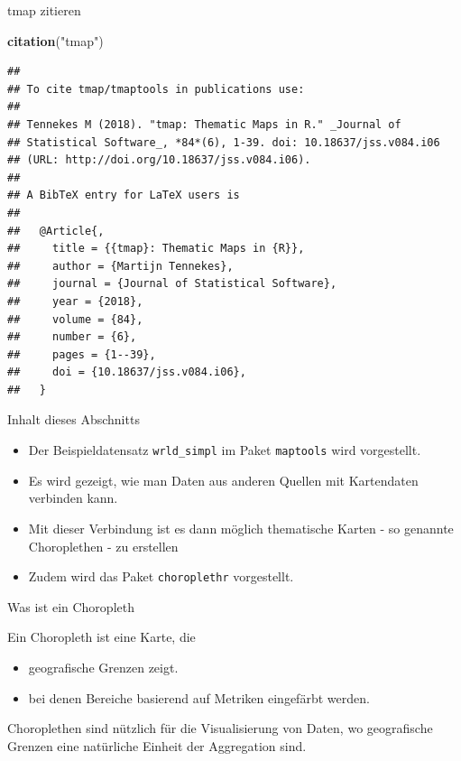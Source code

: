 \documentclass[ignorenonframetext,]{beamer}
\newenvironment{Shaded}{\begin{snugshade}}{\end{snugshade}}
\newcommand{\KeywordTok}[1]{\textcolor[rgb]{0.13,0.29,0.53}{\textbf{#1}}}
\newcommand{\StringTok}[1]{\textcolor[rgb]{0.31,0.60,0.02}{#1}}
\newcommand{\NormalTok}[1]{#1}
\providecommand{\tightlist}{%
  \setlength{\itemsep}{0pt}\setlength{\parskip}{0pt}}
\begin{document}
\begin{frame}[fragile]{tmap zitieren}

\begin{Shaded}
\begin{Highlighting}[]
\KeywordTok{citation}\NormalTok{(}\StringTok{"tmap"}\NormalTok{)}
\end{Highlighting}
\end{Shaded}

\begin{verbatim}
## 
## To cite tmap/tmaptools in publications use:
## 
## Tennekes M (2018). "tmap: Thematic Maps in R." _Journal of
## Statistical Software_, *84*(6), 1-39. doi: 10.18637/jss.v084.i06
## (URL: http://doi.org/10.18637/jss.v084.i06).
## 
## A BibTeX entry for LaTeX users is
## 
##   @Article{,
##     title = {{tmap}: Thematic Maps in {R}},
##     author = {Martijn Tennekes},
##     journal = {Journal of Statistical Software},
##     year = {2018},
##     volume = {84},
##     number = {6},
##     pages = {1--39},
##     doi = {10.18637/jss.v084.i06},
##   }
\end{verbatim}

\end{frame}

\begin{frame}[fragile]{Inhalt dieses Abschnitts}

\begin{itemize}
\tightlist
\item
  Der Beispieldatensatz \texttt{wrld\_simpl} im Paket \texttt{maptools}
  wird vorgestellt.
\item
  Es wird gezeigt, wie man Daten aus anderen Quellen mit Kartendaten
  verbinden kann.
\item
  Mit dieser Verbindung ist es dann möglich thematische Karten - so
  genannte Choroplethen - zu erstellen
\item
  Zudem wird das Paket \texttt{choroplethr} vorgestellt.
\end{itemize}

\end{frame}

\begin{frame}{Was ist ein Choropleth}

Ein Choropleth ist eine Karte, die

\begin{itemize}
\tightlist
\item
  geografische Grenzen zeigt.
\item
  bei denen Bereiche basierend auf Metriken eingefärbt werden.
\end{itemize}

Choroplethen sind nützlich für die Visualisierung von Daten, wo
geografische Grenzen eine natürliche Einheit der Aggregation sind.

\end{frame}
\end{document}
